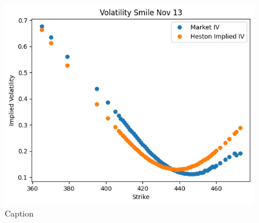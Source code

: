 \begin{figure}[H]
    \includegraphics[scale=0.5]{fig/img/option_pricing/hestonSmileNov13.png}
    \caption{Caption}
    \label{fig:enter-label}
\end{figure}